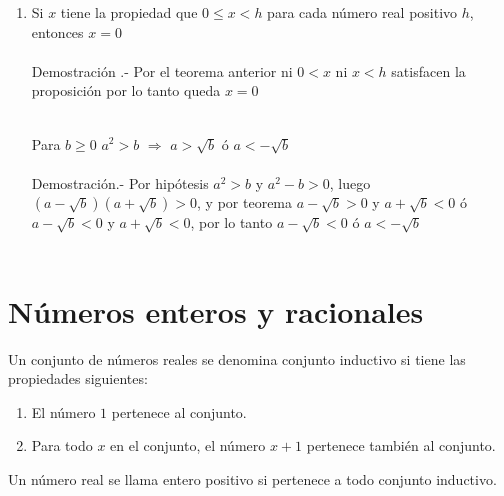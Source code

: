 \begin{enumerate}
\item Si $x$ tiene la propiedad que $0\leq x < h$ para cada número real positivo $h$, entonces $x=0$\\\\
Demostración .- \;                                                                                                                                                                                                                                                                                                                                                                                                                                                                                                                                                                                                                                                                                                                               Por el teorema anterior ni $0<x$ ni $x<h$ satisfacen la proposición por lo tanto queda $x=0$\\\\


\begin{lema}
Para $b\geq 0$ $a^2>b$ $\Rightarrow$ $a>\sqrt{b}$ ó $a<-\sqrt{b}$\\\\
Demostración.- \;
Por hipótesis $a^2>b$ y $a^2-b>0$, luego \; $(a-\sqrt{b})(a+\sqrt{b})>0$, y por teorema  \; $a-\sqrt{b}>0$ \; y \; $a+\sqrt{b}<0$ \; ó \; $a-\sqrt{b}<0$ \; y \; $a+\sqrt{b}<0$, por lo tanto $a-\sqrt{b}<0$ \; ó \; $a<-\sqrt{b}$\\\\
\end{lema}
\end{enumerate}

\section{Números enteros y racionales}
\begin{tcolorbox}[colback=white]
\begin{def.}
Un conjunto de números reales se denomina conjunto inductivo si tiene las propiedades siguientes:
\begin{enumerate}[\bfseries a)]
\item El número $1$ pertenece al conjunto.
\item Para todo $x$ en el conjunto, el número $x+1$ pertenece también al conjunto.
\end{enumerate}
\end{def.}
\begin{def.}
Un número real se llama entero positivo si pertenece a todo conjunto inductivo.
\end{def.}
\end{tcolorbox}

